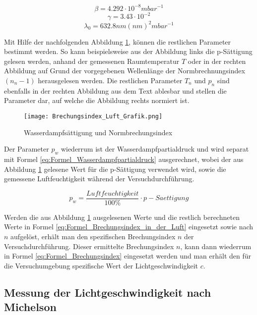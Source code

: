 \begin{equation*}
\beta = 4.292 \cdot 10^{-8} mbar^{-1}
\label{eq:Faktor_Beta}
\end{equation*}
\begin{equation*}
\gamma = 3.43 \cdot 10^{-2}
\label{eq:Faktor_Gamma}
\end{equation*}
\begin{equation*}
\lambda_{0} = 632.8 nm (nm)^{2}mbar^{-1}
\label{eq:Faktor_Lambda}
\end{equation*}

Mit Hilfe der nachfolgenden Abbildung \ref{fig:Wasserdampfsättigung und Normbrechungsindex}, können die restlichen Parameter bestimmt werden. So kann beispielsweise aus der Abbildung links die p-Sättigung gelesen werden, anhand der gemessenen Raumtemperatur $T$ oder in der rechten Abbildung auf Grund der vorgegebenen Wellenlänge der Normbrechnungsindex $(n_{n} - 1)$ herausgelesen werden. Die restlichen Parameter $T_{n}$ und $p_{n}$ sind ebenfalls in der rechten Abbildung aus dem Text ablesbar und stellen die Parameter dar, auf welche die Abbildung rechts normiert ist.

\begin{figure}[b]
\texttt{[image: Brechungsindex\_Luft\_Grafik.png]}
\caption{Wasserdampfsättigung und Normbrechungsindex}
\label{fig:Wasserdampfsättigung und Normbrechungsindex}
\end{figure}

Der Parameter $p_{w}$ wiederrum ist der Wasserdampfpartialdruck und wird separat mit Formel \ref{eq:Formel_Wasserdampfpartialdruck} ausgerechnet, wobei der aus Abbildung \ref{fig:Wasserdampfsättigung und Normbrechungsindex} gelesene Wert für die p-Sättigung verwendet wird, sowie die gemessene Luftfeuchtigkeit während der Versuchdurchführung.


\begin{equation}
p_{w} = \dfrac{Luftfeuchtigkeit}{100\%}\cdot p-Saettigung
\label{eq:Formel_Wasserdampfpartialdruck}
\end{equation}

Werden die aus Abbildung \ref{fig:Wasserdampfsättigung und Normbrechungsindex} ausgelesenen Werte und die restlich berechneten Werte in Formel \ref{eq:Formel_Brechungsindex_in_der_Luft} eingesetzt sowie nach $n$ aufgelöst, erhält man den spezifischen Brechungsindex $n$ der Versuchdurchführung. Dieser ermittelte Brechungsindex $n$, kann dann wiederrum in Formel \ref{eq:Formel_Brechungsindex} eingesetzt werden und man erhält den für die Versuchumgebung spezifische Wert der Lichtgeschwindigkeit $c$. 

\subsection{Messung der Lichtgeschwindigkeit nach Michelson}
